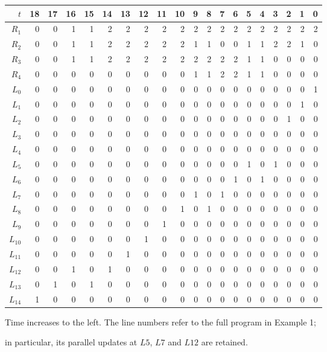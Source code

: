 \documentclass[11pt,leqno]{article}
\begin{document}
\begin{center}
\small
\setlength{\tabcolsep}{3.4pt}
\renewcommand{\arraystretch}{1.04}
\begin{tabular}{@{}r*{19}{r}@{}}
\toprule
$t$ & 18 & 17 & 16 & 15 & 14 & 13 & 12 & 11 & 10 & 9 & 8 & 7 & 6 & 5 & 4 & 3 & 2 & 1 & 0 \\
\midrule
$R_{1}$ & 0 & 0 & 1 & 1 & 2 & 2 & 2 & 2 & 2 & 2 & 2 & 2 & 2 & 2 & 2 & 2 & 2 & 2 & 2 \\
$R_{2}$ & 0 & 0 & 1 & 1 & 2 & 2 & 2 & 2 & 2 & 1 & 1 & 0 & 0 & 1 & 1 & 2 & 2 & 1 & 0 \\
$R_{3}$ & 0 & 0 & 1 & 1 & 2 & 2 & 2 & 2 & 2 & 2 & 2 & 2 & 2 & 1 & 1 & 0 & 0 & 0 & 0 \\
$R_{4}$ & 0 & 0 & 0 & 0 & 0 & 0 & 0 & 0 & 0 & 1 & 1 & 2 & 2 & 1 & 1 & 0 & 0 & 0 & 0 \\
\midrule
$L_{0}$ & 0 & 0 & 0 & 0 & 0 & 0 & 0 & 0 & 0 & 0 & 0 & 0 & 0 & 0 & 0 & 0 & 0 & 0 & 1 \\
$L_{1}$ & 0 & 0 & 0 & 0 & 0 & 0 & 0 & 0 & 0 & 0 & 0 & 0 & 0 & 0 & 0 & 0 & 0 & 1 & 0 \\
$L_{2}$ & 0 & 0 & 0 & 0 & 0 & 0 & 0 & 0 & 0 & 0 & 0 & 0 & 0 & 0 & 0 & 0 & 1 & 0 & 0 \\
$L_{3}$ & 0 & 0 & 0 & 0 & 0 & 0 & 0 & 0 & 0 & 0 & 0 & 0 & 0 & 0 & 0 & 0 & 0 & 0 & 0 \\
$L_{4}$ & 0 & 0 & 0 & 0 & 0 & 0 & 0 & 0 & 0 & 0 & 0 & 0 & 0 & 0 & 0 & 0 & 0 & 0 & 0 \\
$L_{5}$ & 0 & 0 & 0 & 0 & 0 & 0 & 0 & 0 & 0 & 0 & 0 & 0 & 0 & 1 & 0 & 1 & 0 & 0 & 0 \\
$L_{6}$ & 0 & 0 & 0 & 0 & 0 & 0 & 0 & 0 & 0 & 0 & 0 & 0 & 1 & 0 & 1 & 0 & 0 & 0 & 0 \\
$L_{7}$ & 0 & 0 & 0 & 0 & 0 & 0 & 0 & 0 & 0 & 1 & 0 & 1 & 0 & 0 & 0 & 0 & 0 & 0 & 0 \\
$L_{8}$ & 0 & 0 & 0 & 0 & 0 & 0 & 0 & 0 & 1 & 0 & 1 & 0 & 0 & 0 & 0 & 0 & 0 & 0 & 0 \\
$L_{9}$ & 0 & 0 & 0 & 0 & 0 & 0 & 0 & 1 & 0 & 0 & 0 & 0 & 0 & 0 & 0 & 0 & 0 & 0 & 0 \\
$L_{10}$ & 0 & 0 & 0 & 0 & 0 & 0 & 1 & 0 & 0 & 0 & 0 & 0 & 0 & 0 & 0 & 0 & 0 & 0 & 0 \\
$L_{11}$ & 0 & 0 & 0 & 0 & 0 & 1 & 0 & 0 & 0 & 0 & 0 & 0 & 0 & 0 & 0 & 0 & 0 & 0 & 0 \\
$L_{12}$ & 0 & 0 & 1 & 0 & 1 & 0 & 0 & 0 & 0 & 0 & 0 & 0 & 0 & 0 & 0 & 0 & 0 & 0 & 0 \\
$L_{13}$ & 0 & 1 & 0 & 1 & 0 & 0 & 0 & 0 & 0 & 0 & 0 & 0 & 0 & 0 & 0 & 0 & 0 & 0 & 0 \\
$L_{14}$ & 1 & 0 & 0 & 0 & 0 & 0 & 0 & 0 & 0 & 0 & 0 & 0 & 0 & 0 & 0 & 0 & 0 & 0 & 0 \\
\bottomrule
\end{tabular}
\par\smallskip
\footnotesize Time increases to the left. The line numbers refer to the full program in Example 1;\par
in particular, its parallel updates at $L5$, $L7$ and $L12$ are retained.
\end{center}
\end{document}
